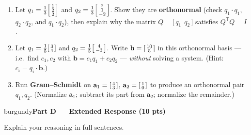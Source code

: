 \documentclass[10pt]{article}
\newcommand{\bb}{\mathbf{b}}
\newcommand{\pp}{\mathbf{p}}
\newcommand{\ee}{\mathbf{e}}
\newcommand{\avec}{\mathbf{a}}
\newcommand{\T}{^{\mathsf T}}
\newcommand{\parthead}[1]{%
  \vspace{6pt}\noindent
  \begin{headlinebox}{burgundy}{\color{white}\bfseries #1}\end{headlinebox}%
  \vspace{4pt}}
\begin{document}
\begin{enumerate}[leftmargin=1.9em, itemsep=12pt]
        $\ee=\bb-\pp$. What is $\sum e_i$?
        \vspace{2.8cm}
  \item Let $q_1=\tfrac13\begin{bsmallmatrix}1\\2\\2\end{bsmallmatrix}$ and
        $q_2=\tfrac13\begin{bsmallmatrix}2\\1\\-2\end{bsmallmatrix}$. Show they are \textbf{orthonormal}
        (check $q_1\cdot q_1$, $q_2\cdot q_2$, and $q_1\cdot q_2$), then explain why the matrix
        $Q=\big[\,q_1\ \ q_2\,\big]$ satisfies $Q\T Q=I$.
        \vspace{2.4cm}
  \item Let $q_1=\tfrac15\begin{bsmallmatrix}3\\4\end{bsmallmatrix}$ and $q_2=\tfrac15\begin{bsmallmatrix}4\\-3\end{bsmallmatrix}$.
        Write $\bb=\begin{bsmallmatrix}10\\5\end{bsmallmatrix}$ in this orthonormal basis --- i.e.\ find
        $c_1,c_2$ with $\bb=c_1q_1+c_2q_2$ --- \emph{without} solving a system. (Hint: $c_i=q_i\cdot\bb$.)
        \vspace{2.2cm}
  \item Run \textbf{Gram--Schmidt} on $\avec_1=\begin{bsmallmatrix}4\\3\end{bsmallmatrix}$,
        $\avec_2=\begin{bsmallmatrix}1\\0\end{bsmallmatrix}$ to produce an orthonormal pair $q_1,q_2$.
        (Normalize $\avec_1$; subtract its part from $\avec_2$; normalize the remainder.)
        \vspace{2.6cm}
\end{enumerate}

\parthead{Part D --- Extended Response (10 pts)}
Explain your reasoning in full sentences.
\end{document}
